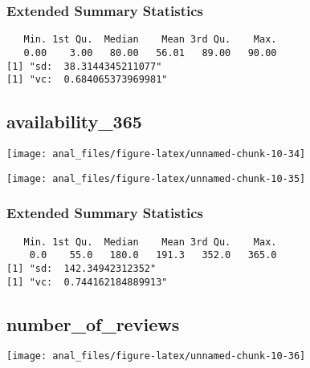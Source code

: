 \hypertarget{extended-summary-statistics-9}{%
\subsubsection{Extended Summary
Statistics}\label{extended-summary-statistics-9}}

\begin{verbatim}   Min. 1st Qu.  Median    Mean 3rd Qu.    Max. 
   0.00    3.00   80.00   56.01   89.00   90.00 
[1] "sd:  38.3144345211077"
[1] "vc:  0.684065373969981"
\end{verbatim}

\pagebreak

\centering

\hypertarget{availability_365}{%
\subsection{availability\_365}\label{availability_365}}

\begin{center}\texttt{[image: anal\_files/figure-latex/unnamed-chunk-10-34]} \end{center}

\begin{center}\texttt{[image: anal\_files/figure-latex/unnamed-chunk-10-35]} \end{center}

\hypertarget{extended-summary-statistics-10}{%
\subsubsection{Extended Summary
Statistics}\label{extended-summary-statistics-10}}

\begin{verbatim}   Min. 1st Qu.  Median    Mean 3rd Qu.    Max. 
    0.0    55.0   180.0   191.3   352.0   365.0 
[1] "sd:  142.34942312352"
[1] "vc:  0.744162184889913"
\end{verbatim}

\pagebreak

\centering

\hypertarget{number_of_reviews}{%
\subsection{number\_of\_reviews}\label{number_of_reviews}}

\begin{center}\texttt{[image: anal\_files/figure-latex/unnamed-chunk-10-36]} \end{center}


